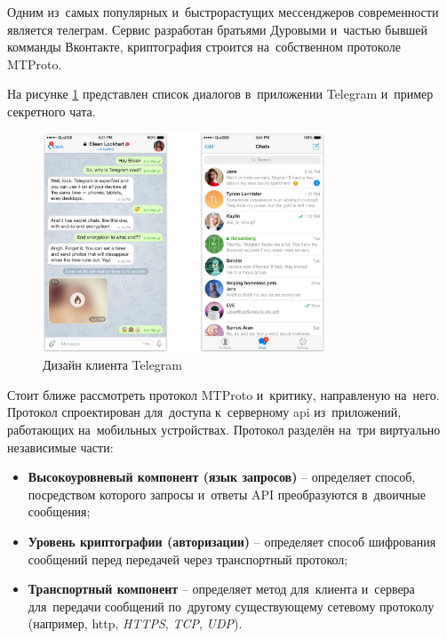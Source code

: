 \subsubsection{}
\label{sec:analysis:research:analogs:telegram}

Одним из~самых популярных и~быстрорастущих мессенджеров современности является телеграм. 
Сервис разработан братьями Дуровыми и~частью бывшей комманды Вконтакте, криптография строится на~собственном протоколе MTProto.

На рисунке \ref{sec:analysis:research:analogs:telegram:ui} представлен список диалогов в~приложении Telegram и~пример секретного чата.

\begin{figure}[h]
  \centering
    \includegraphics[width=0.75\textwidth]{inc/img/tg_combined.jpg}
  \caption{Дизайн клиента Telegram}
  \label{sec:analysis:research:analogs:telegram:ui}
\end{figure}

Стоит ближе рассмотреть протокол MTProto и~критику, направленую на~него. Протокол спроектирован для~доступа к~серверному \gls{api} из~приложений, работающих на~мобильных устройствах. 
Протокол разделён на~три виртуально независимые части: 
\begin{itemize}
	\item \textbf{Высокоуровневый компонент (язык запросов)} -- определяет способ, посредством которого запросы и~ответы API преобразуются в~двоичные сообщения;
	\item \textbf{Уровень криптографии (авторизации)} -- определяет способ шифрования сообщений перед передачей через транспортный протокол;
	\item \textbf{Транспортный компонент} -- определяет метод для~клиента и~сервера для~передачи сообщений по~другому существующему сетевому протоколу (например, \gls{http}, \textit{HTTPS}, \textit{TCP}, \textit{UDP}).
\end{itemize}

